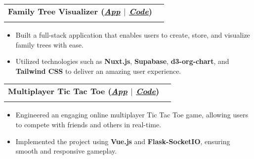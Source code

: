 \documentclass[a4paper,10pt]{article}
\makeatletter
\newcommand{\resumeSubheading}[4]{
  \vspace{-1pt}\item
    \begin{tabular*}{0.97\textwidth}[t]{l@{\extracolsep{\fill}}r}
      \textbf{#1} & #2 \\
      \textit{\normalsize#3} & \textit{\normalsize #4} \\
    \end{tabular*}\vspace{-7pt}
}
\makeatother
\begin{document}
\resumeSubheading
{Family Tree Visualizer (\textit{\href{https://familivistas.vercel.app/}{\textbf{\underline{App}}} $|$ \href{https://github.com/AnkushSarkar10/family-tree-app}{\textbf{\underline{Code}}}})}{}{}{}
\vspace{-10pt}
\begin{itemize}[leftmargin=0.15in]
  \item Built a full-stack application that enables users to create, store, and visualize family trees with ease.
  \item Utilized technologies such as \textbf{Nuxt.js}, \textbf{Supabase}, \textbf{d3-org-chart}, and \textbf{Tailwind CSS} to deliver an amazing user experience.
\end{itemize}
\vspace{-5pt}


\resumeSubheading
{Multiplayer Tic Tac Toe (\textit{\href{https://vue-flask-tic-tac-toe.web.app/}{\textbf{\underline{App}}} $|$ \href{https://github.com/AnkushSarkar10/vue-flask-tic-tac-toe}{\textbf{\underline{Code}}}})}{}{}{}
\vspace{-10pt}
\begin{itemize}[leftmargin=0.15in]
  \item Engineered an engaging online multiplayer Tic Tac Toe game, allowing users to compete with friends and others in real-time.
  \item Implemented the project using \textbf{Vue.js} and \textbf{Flask-SocketIO}, ensuring smooth and responsive gameplay.
\end{itemize}
\vspace{-5pt}


\end{document}
